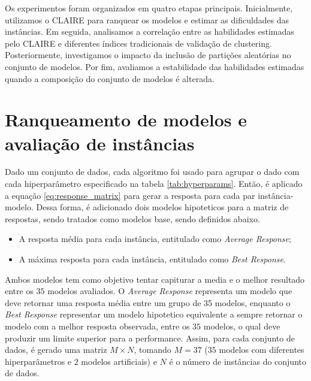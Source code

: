 Os experimentos foram organizados em quatro etapas principais. Inicialmente, utilizamos o \gls{CLAIRE} para ranquear os modelos e estimar as dificuldades das instâncias. Em seguida, analisamos a correlação entre as habilidades estimadas pelo \gls{CLAIRE} e diferentes índices tradicionais de validação de clustering. Posteriormente, investigamos o impacto da inclusão de partições aleatórias no conjunto de modelos. Por fim, avaliamos a estabilidade das habilidades estimadas quando a composição do conjunto de modelos é alterada.


\section{Ranqueamento de modelos e avaliação de instâncias}\label{sec:ranquemaento}

Dado um conjunto de dados, cada algoritmo foi usado para agrupar o dado com cada hiperparâmetro especificado na tabela \ref{tab:hyperparams}. Então, é aplicado a equação \ref{eq:response_matrix} para gerar a resposta para cada par instância-modelo. Dessa forma, é adicionado dois modelos hipoteticos para a matriz de respostas, sendo tratados como modelos base, sendo definidos abaixo.

\begin{itemize}
    \item[1] A resposta média para cada instância, entitulado como \textit{Average Response};
    \item[2] A máxima resposta para cada instância, entitulado como \textit{Best Response}.
\end{itemize}

Ambos modelos tem como objetivo tentar capiturar a media e o melhor resultado entre os $35$ modelos avaliados. O \textit{Average Response} representa um modelo que deve retornar uma resposta média entre um grupo de 35 modelos, enquanto o \textit{Best Response} representar um modelo hipotetico equivalente a sempre retornar o modelo com a melhor resposta observada, entre os $35$ modelos, o qual deve produzir um limite superior para a performance. Assim, para cada conjunto de dados, é gerado uma matriz $M \times N$, tomando $M = 37$ ($35$ modelos com diferentes hiperparâmetros e $2$ modelos artificiais) e $N$ é o número de instâncias do conjunto de dados.

